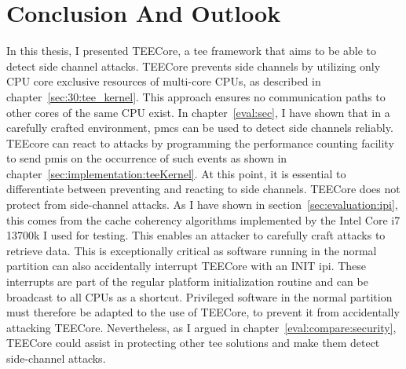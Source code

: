 \chapter{Conclusion And Outlook}
\label{sec:conclusion}



In this thesis, I presented TEECore, a \gls{tee} framework that aims to be able
to detect side channel attacks. TEECore prevents side channels by utilizing only
CPU core exclusive resources of multi-core CPUs, as described in
chapter~\ref{sec:30:tee_kernel}. This approach ensures no communication paths to
other cores of the same CPU exist. In chapter~\ref{eval:sec}, I have shown that
in a carefully crafted environment, \glspl{pmc} can be used to detect side
channels reliably. TEEcore can react to attacks by programming the performance
counting facility to send \glspl{pmi} on the occurrence of such events as shown
in chapter~\ref{sec:implementation:teeKernel}. At this point, it is essential to
differentiate between preventing and reacting to side channels. TEECore does not
protect from side-channel attacks. As I have shown in
section~\ref{sec:evaluation:ipi}, this comes from the cache coherency algorithms
implemented by the Intel Core i7 13700k I used for testing. This enables an
attacker to carefully craft attacks to retrieve data. This is exceptionally
critical as software running in the normal partition can also accidentally
interrupt TEECore with an INIT \gls{ipi}. These interrupts are part of the
regular platform initialization routine and can be broadcast to all CPUs as a
shortcut. Privileged software in the normal partition must therefore be adapted
to the use of TEECore, to prevent it from accidentally attacking TEECore.
Nevertheless, as I argued in chapter~\ref{eval:compare:security}, TEECore could
assist in protecting other \gls{tee} solutions and make them detect side-channel
attacks.

